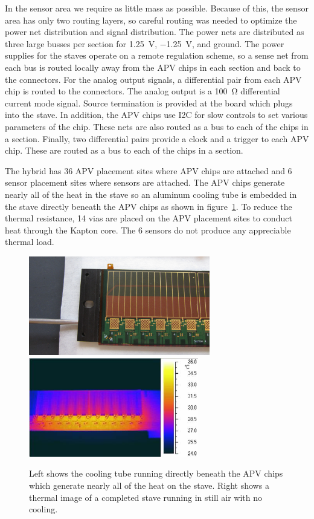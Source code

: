 \documentclass[1p,12pt]{elsarticle}
\begin{document}
In the sensor area we require as little mass as possible. Because of this, the sensor area has
only two routing layers, so careful routing was needed to optimize the power net
distribution and signal distribution. The power nets are distributed as three
large busses per section for \SI{+1.25}{\volt}, \SI{-1.25}{\volt}, and ground. The power supplies
for the staves operate on a remote regulation scheme, so a sense net from each bus is
routed locally away from the APV chips in each section and back to the
connectors. For
the analog output signals, a differential pair from each APV chip is routed to the
connectors. The analog output is a \SI{100}{\ohm} differential current mode signal. Source
termination is provided at the board which plugs into the stave. In addition,
the APV chips use I2C for slow controls to set various parameters of the chip.
These nets are also routed as a bus to each of the chips in a section. Finally,
two differential pairs provide a clock and a trigger to each APV chip. These
are routed as a bus to each of the chips in a section. 

The hybrid has 36 APV placement sites where APV chips are attached and 6 sensor
placement sites where sensors are attached. The APV chips generate nearly all of
the heat in the stave so an aluminum cooling tube is embedded in the stave
directly beneath the APV chips as shown in figure~\ref{fig:cooling_tube}. To reduce the thermal resistance, 14 vias are placed on the APV
placement sites to conduct heat through the Kapton core. The 6 sensors do not
produce any appreciable thermal load.

\begin{figure}[ht]
\begin{center}
\includegraphics[height=1.7in, keepaspectratio=true, angle=0]{graphics/cooling_tube.jpg}
\includegraphics[height=1.7in, keepaspectratio=true, angle=0]{graphics/apv_thermal.jpg}
\caption{Left shows the cooling tube running directly beneath the APV chips which generate nearly
all of the heat on the stave.  Right shows a thermal image of a completed stave
running in still air with no cooling.
\label{fig:cooling_tube}}
\end{center}
\end{figure}
%
\end{document}
